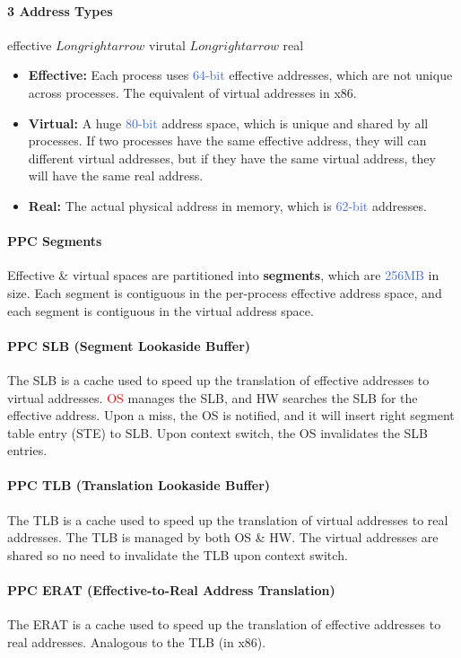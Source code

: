 \documentclass[openany,12pt]{book}
\newcommand{\red}[1]{\textcolor{Red}{#1}}
\newcommand{\blue}[1]{\textcolor{RoyalBlue}{#1}}
\begin{document}
\paragraph{3 Address Types} effective \(Longrightarrow\) virutal \(Longrightarrow\) real
\begin{itemize}
  \item \textbf{Effective:} Each process uses \blue{64-bit} effective addresses, which are not unique across processes. The equivalent of virtual addresses in x86.
  \item \textbf{Virtual:} A huge \blue{80-bit} address space, which is unique and shared by all processes. If two processes have the same effective address, they will can different virtual addresses, but if they have the same virtual address, they will have the same real address.
  \item \textbf{Real:} The actual physical address in memory, which is \blue{62-bit} addresses.
\end{itemize}

\paragraph{PPC Segments} Effective \& virtual spaces are partitioned into \textbf{segments}, which are \blue{256MB} in size. Each segment is contiguous in the per-process effective address space, and each segment is contiguous in the virtual address space. 


\paragraph{PPC SLB (Segment Lookaside Buffer)} The SLB is a cache used to speed up the translation of effective addresses to virtual addresses. \red{OS} manages the SLB, and HW searches the SLB for the effective address. Upon a miss, the OS is notified, and it will insert right segment table entry (STE) to SLB. Upon context switch, the OS invalidates the SLB entries. 

\paragraph{PPC TLB (Translation Lookaside Buffer)} The TLB is a cache used to speed up the translation of virtual addresses to real addresses. The TLB is managed by both OS \& HW. The virtual addresses are shared so no need to invalidate the TLB upon context switch.

\paragraph{PPC ERAT (Effective-to-Real Address Translation)} The ERAT is a cache used to speed up the translation of effective addresses to real addresses. Analogous to the TLB (in x86). 
\end{document}
